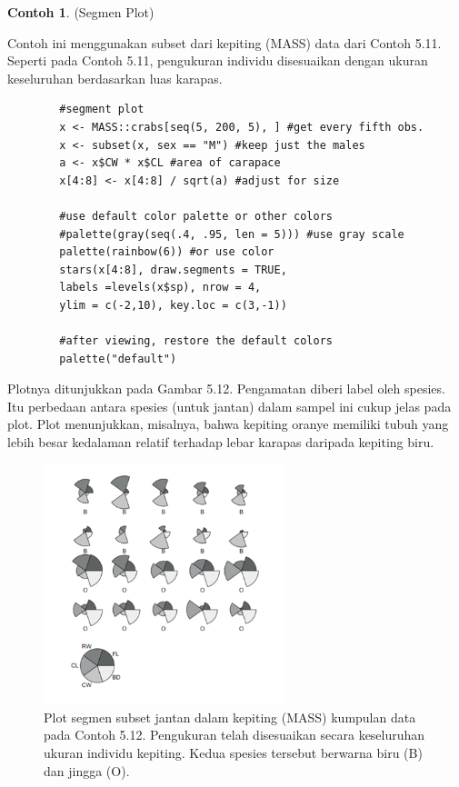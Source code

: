 \documentclass[a4paper,12pt]{article}
\theoremstyle{definition}
\newtheorem{example}{Contoh}[section]
\begin{document}
\begin{example}(Segmen Plot)

    Contoh ini menggunakan subset dari kepiting (MASS) data dari Contoh 5.11. Seperti pada Contoh 5.11, pengukuran individu disesuaikan dengan ukuran keseluruhan berdasarkan luas karapas.

    \begin{lstlisting}
        #segment plot
        x <- MASS::crabs[seq(5, 200, 5), ] #get every fifth obs.
        x <- subset(x, sex == "M") #keep just the males
        a <- x$CW * x$CL #area of carapace
        x[4:8] <- x[4:8] / sqrt(a) #adjust for size
        
        #use default color palette or other colors
        #palette(gray(seq(.4, .95, len = 5))) #use gray scale
        palette(rainbow(6)) #or use color
        stars(x[4:8], draw.segments = TRUE,
        labels =levels(x$sp), nrow = 4,
        ylim = c(-2,10), key.loc = c(3,-1))
        
        #after viewing, restore the default colors
        palette("default")
    \end{lstlisting}

    Plotnya ditunjukkan pada Gambar 5.12. Pengamatan diberi label oleh spesies. Itu perbedaan antara spesies (untuk jantan) dalam sampel ini cukup jelas pada plot. Plot menunjukkan, misalnya, bahwa kepiting oranye memiliki tubuh yang lebih besar kedalaman relatif terhadap lebar karapas daripada kepiting biru.

    \begin{figure}[H]
        \centering
        \includegraphics[height=7cm]{gb/K3G4.png}
        \caption{Plot segmen subset jantan dalam kepiting (MASS)  kumpulan data pada Contoh 5.12. Pengukuran telah disesuaikan secara keseluruhan ukuran individu kepiting. Kedua spesies tersebut berwarna biru (B) dan jingga (O).}
        \label{fig:my_label}
    \end{figure}
\end{example}
\end{document}
